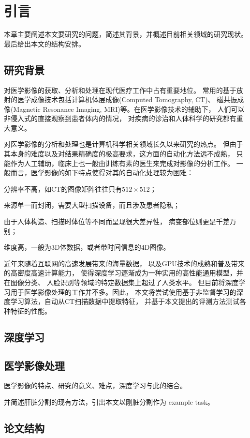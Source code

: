 
\chapter{引言}
本章主要阐述本文要研究的问题，简述其背景，并概述目前相关领域的研究现状。
最后给出本文的结构安排。

\section{研究背景}
对医学影像的获取、分析和处理在现代医疗工作中占有重要地位。
常用的基于放射的医学成像技术包括计算机体层成像(Computed Tomography, CT)、
磁共振成像(Magnetic Resonance Imaging, MRI)等。在医学影像技术的辅助下，
人们可以非侵入式的直接观察到患者体内的情况，
对疾病的诊治和人体科学的研究都有重大意义。

对医学影像的分析和处理也是计算机科学相关领域长久以来研究的热点。
但由于其本身的难度以及对结果精确度的极高要求，这方面的自动化方法远不成熟，
只能作为人工辅助，临床上也一般由训练有素的医生来完成对影像的分析工作。
一般而言，医学影像的如下特点使得对其的自动化处理较为困难：
\begin{inparaenum}[\itshape 1\upshape)]
    \item 分辨率不高，如CT的图像矩阵往往只有$512\times 512$\cite{medimging2}；
    \item 来源单一而封闭，需要大型扫描设备，而且涉及患者隐私；
    \item 由于人体构造、扫描时体位等不同而呈现很大差异性，
        病变部位则更是千差万别；
    \item 维度高，一般为3D体数据，或者带时间信息的4D图像。
\end{inparaenum}

近年来随着互联网的高速发展带来的海量数据，
以及GPU技术的成熟和普及带来的高密度高速计算能力，
使得深度学习逐渐成为一种实用的高性能通用模型，并在图像分类\cite{he2015delving}、
人脸识别\cite{schroff2015facenet}等领域的特定数据集上超过了人类水平。
但目前将深度学习用于医学影像处理的工作并不多。因此，
本文将尝试使用基于非监督学习的深度学习算法，自动从CT扫描数据中提取特征，
并基于本文提出的评测方法测试各种特征的性能。


\section{深度学习}


\section{医学影像处理}
医学影像的特点、研究的意义、难点，深度学习与此的结合。

并简述肝脏分割的现有方法，引出本文以刚脏分割作为 example task。

\section{论文结构}


